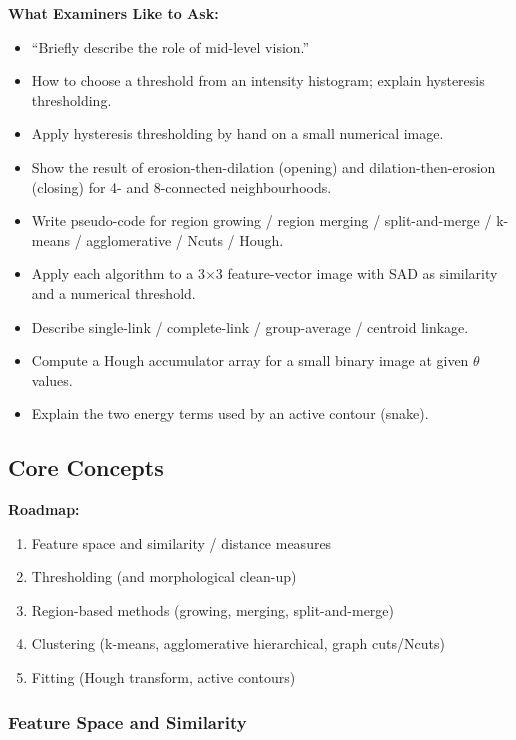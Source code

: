 \separator

\textbf{What Examiners Like to Ask:}
\begin{itemize}
  \item ``Briefly describe the role of mid-level vision.''
  \item How to choose a threshold from an intensity histogram; explain hysteresis thresholding.
  \item Apply hysteresis thresholding by hand on a small numerical image.
  \item Show the result of erosion-then-dilation (opening) and dilation-then-erosion (closing) for 4- and 8-connected neighbourhoods.
  \item Write pseudo-code for region growing / region merging / split-and-merge / k-means / agglomerative / Ncuts / Hough.
  \item Apply each algorithm to a 3$\times$3 feature-vector image with SAD as similarity and a numerical threshold.
  \item Describe single-link / complete-link / group-average / centroid linkage.
  \item Compute a Hough accumulator array for a small binary image at given $\theta$ values.
  \item Explain the two energy terms used by an active contour (snake).
\end{itemize}

\subsection{Core Concepts}

\textbf{Roadmap:}
\begin{enumerate}
  \item Feature space and similarity / distance measures
  \item Thresholding (and morphological clean-up)
  \item Region-based methods (growing, merging, split-and-merge)
  \item Clustering (k-means, agglomerative hierarchical, graph cuts/Ncuts)
  \item Fitting (Hough transform, active contours)
\end{enumerate}

\bigseparator

\subsubsection{Feature Space and Similarity}

